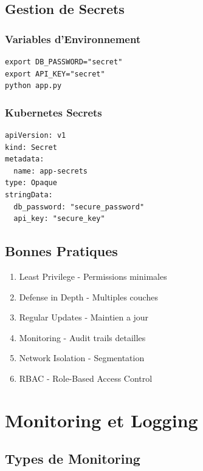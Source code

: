 \documentclass[12pt,a4paper]{report}
\begin{document}
\section{Gestion de Secrets}

\subsection{Variables d'Environnement}

\begin{lstlisting}
export DB_PASSWORD="secret"
export API_KEY="secret"
python app.py
\end{lstlisting}

\subsection{Kubernetes Secrets}

\begin{lstlisting}
apiVersion: v1
kind: Secret
metadata:
  name: app-secrets
type: Opaque
stringData:
  db_password: "secure_password"
  api_key: "secure_key"
\end{lstlisting}

\section{Bonnes Pratiques}

\begin{enumerate}
    \item Least Privilege - Permissions minimales
    \item Defense in Depth - Multiples couches
    \item Regular Updates - Maintien a jour
    \item Monitoring - Audit trails detailles
    \item Network Isolation - Segmentation
    \item RBAC - Role-Based Access Control
\end{enumerate}

\newpage

\chapter{Monitoring et Logging}

\section{Types de Monitoring}
\end{document}
